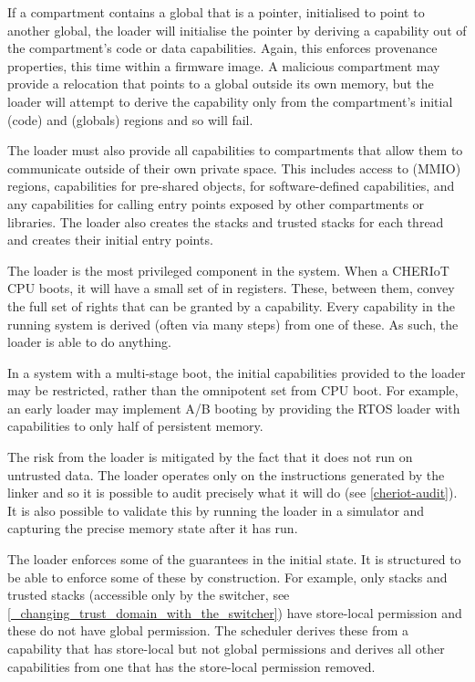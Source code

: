 If a compartment contains a global that is a pointer, initialised to point to another global, the loader will initialise the pointer by deriving a capability out of the compartment's code or data capabilities.
Again, this enforces provenance properties, this time within a firmware image.
A malicious compartment may provide a relocation that points to a global outside its own memory, but the loader will attempt to derive the capability only from the compartment's initial  (code) and  (globals) regions and so will fail.

The loader must also provide all capabilities to compartments that allow them to communicate outside of their own private space.
This includes access to  (MMIO) regions, capabilities for pre-shared objects, for software-defined capabilities, and any capabilities for calling entry points exposed by other compartments or libraries.
The loader also creates the stacks and trusted stacks for each thread and creates their initial entry points.

The loader is the most privileged component in the system.
When a CHERIoT CPU boots, it will have a small set of  in registers.
These, between them, convey the full set of rights that can be granted by a capability.
Every capability in the running system is derived (often via many steps) from one of these.
As such, the loader is able to do anything.

\begin{note}
In a system with a multi-stage boot, the initial capabilities provided to the loader may be restricted, rather than the omnipotent set from CPU boot.
For example, an early loader may implement A/B booting by providing the RTOS loader with capabilities to only half of persistent memory.
\end{note}

The risk from the loader is mitigated by the fact that it does not run on untrusted data.
The loader operates only on the instructions generated by the linker and so it is possible to audit precisely what it will do (see \ref{cheriot-audit}).
It is also possible to validate this by running the loader in a simulator and capturing the precise memory state after it has run.

The loader enforces some of the guarantees in the initial state.
It is structured to be able to enforce some of these by construction.
For example, only stacks and trusted stacks (accessible only by the switcher, see \ref{_changing_trust_domain_with_the_switcher}) have store-local permission and these do not have global permission.
The scheduler derives these from a capability that has store-local but not global permissions and derives all other capabilities from one that has the store-local permission removed.


